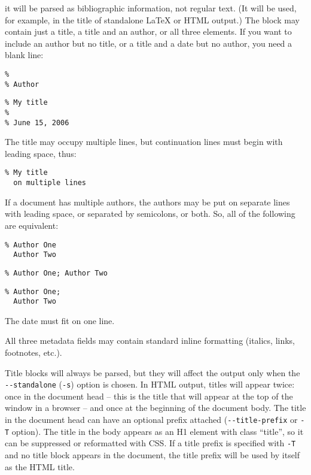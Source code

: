\documentclass[
]{article}
\begin{document}
it will be parsed as bibliographic information, not regular text. (It
will be used, for example, in the title of standalone LaTeX or HTML
output.) The block may contain just a title, a title and an author, or
all three elements. If you want to include an author but no title, or a
title and a date but no author, you need a blank line:

\begin{verbatim}
%
% Author
\end{verbatim}

\begin{verbatim}
% My title
%
% June 15, 2006
\end{verbatim}

The title may occupy multiple lines, but continuation lines must begin
with leading space, thus:

\begin{verbatim}
% My title
  on multiple lines
\end{verbatim}

If a document has multiple authors, the authors may be put on separate
lines with leading space, or separated by semicolons, or both. So, all
of the following are equivalent:

\begin{verbatim}
% Author One
  Author Two
\end{verbatim}

\begin{verbatim}
% Author One; Author Two
\end{verbatim}

\begin{verbatim}
% Author One;
  Author Two
\end{verbatim}

The date must fit on one line.

All three metadata fields may contain standard inline formatting
(italics, links, footnotes, etc.).

Title blocks will always be parsed, but they will affect the output only
when the \texttt{-\/-standalone} (\texttt{-s}) option is chosen. In HTML
output, titles will appear twice: once in the document head -- this is
the title that will appear at the top of the window in a browser -- and
once at the beginning of the document body. The title in the document
head can have an optional prefix attached (\texttt{-\/-title-prefix} or
\texttt{-T} option). The title in the body appears as an H1 element with
class ``title'', so it can be suppressed or reformatted with CSS. If a
title prefix is specified with \texttt{-T} and no title block appears in
the document, the title prefix will be used by itself as the HTML title.
\end{document}
